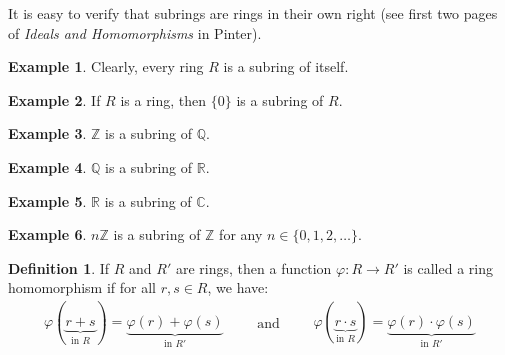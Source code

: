 \documentclass[12pt,letterpaper,DIV=11,final]{scrartcl}
\theoremstyle{plain}
\theoremstyle{definition}
\newtheorem{definition}{Definition}[section]
\newtheorem{example}{Example}[section]
\theoremstyle{remark}
\newtheorem*{comment}{Comment}
\begin{document}
It is easy to verify that subrings are rings in their own right (see first two pages of \emph{Ideals and Homomorphisms} in Pinter).

\begin{example}\label{ex:subring_self}
  Clearly, every ring $R$ is a subring of itself.
\end{example}

\begin{example}\label{ex:subring_zero}
  If $R$ is a ring, then $\{ 0 \}$ is a subring of $R$.
\end{example}

\begin{example}\label{ex:subring_Z}
  $\mathbb{Z}$ is a subring of $\mathbb{Q}$.
\end{example}

\begin{example}\label{ex:subring_Q}
  $\mathbb{Q}$ is a subring of $\mathbb{R}$.
\end{example}

\begin{example}\label{ex:subring_R}
  $\mathbb{R}$ is a subring of $\mathbb{C}$.
\end{example}

\begin{example}\label{ex:subring_nZ}
  $n \mathbb{Z}$ is a subring of $\mathbb{Z}$ for any $n \in \{ 0, 1, 2, \dots \}$.
\end{example}

\begin{comment}
  In most algebra textbooks, rings are taken to be commutative rings with unity and subrings are required to contain the unity element.
  Note that Examples~\ref{ex:subring_self},~\ref{ex:subring_Z},~\ref{ex:subring_Q}, and~\ref{ex:subring_R} are subrings in this more restrictive sense,
  but Examples~\ref{ex:subring_zero} and~\ref{ex:subring_nZ} are not.
\end{comment}

\begin{definition}
  If $R$ and $R'$ are rings, then a function $\varphi : R \to R'$ is called a ring homomorphism if for all $r, s \in R$, we have:
  \begin{displaymath}
    \begin{gathered}
      \varphi(\underbrace{r + s}_\text{in $R$}) = \underbrace{\varphi(r) + \varphi(s)}_\text{in $R'$}
    \end{gathered}
    \qquad \text{and} \qquad
    \begin{gathered}
      \varphi(\underbrace{r \cdot s}_\text{in $R$}) = \underbrace{\varphi(r) \cdot \varphi(s)}_\text{in $R'$}
    \end{gathered}
  \end{displaymath}
\end{definition}
\end{document}
